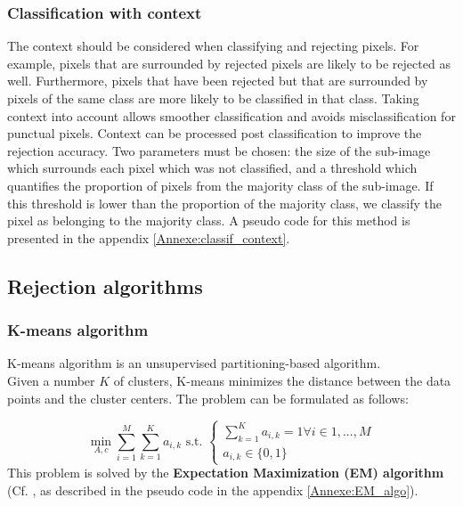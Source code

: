 \documentclass{siamart171218}
\begin{document}
\subsubsection{Classification with context}

The context should be considered when classifying and rejecting pixels. For example, pixels that are surrounded by rejected pixels are likely to be rejected as well. Furthermore, pixels that have been rejected but that are surrounded by pixels of the same class are more likely to be classified in that class. Taking context into account allows smoother classification and avoids misclassification for punctual pixels. Context can be processed post classification to improve the rejection accuracy. Two parameters must be chosen: the size of the sub-image which surrounds each pixel which was not classified, and a threshold which quantifies the proportion of pixels from the majority class of the sub-image. If this threshold is lower than the proportion of the majority class, we classify the pixel as belonging to the majority class. A pseudo code for this method is presented in the appendix \ref{Annexe:classif_context}.


\subsection{ Rejection algorithms}

\subsubsection{K-means algorithm}
\label{section:KmeansAlgo}

K-means algorithm is an unsupervised partitioning-based algorithm. \\ Given a number $K$ of clusters, K-means minimizes the distance between the data points and the cluster centers. The problem can be formulated as follows: 

\begin{equation}
\min_{A,c} \sum_{i=1}^M\sum_{k=1}^K a_{i,k} \text{ s.t. } 
\begin{cases}
      \sum_{k=1}^K a_{i,k} = 1 \forall i \in {1,...,M} \\
      a_{i,k} \in \{0,1\}
    \end{cases} 
    \label{Kmeans_pb}
\end{equation}
This problem is solved by the \textbf{Expectation Maximization (EM) algorithm} (Cf. \cite{polyADD}, as described in the pseudo code in the appendix \ref{Annexe:EM_algo}).
\end{document}
